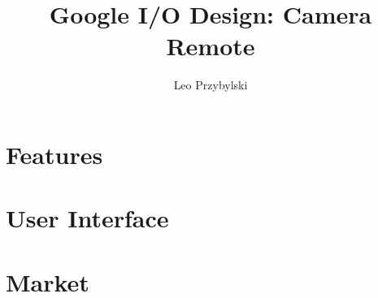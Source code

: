 \documentclass[12pt,notitlepage]{article}
\author{Leo Przybylski}
\title{Google I/O Design: Camera Remote}
\begin{document}
\maketitle
\tableofcontents

\abstract{}

\section{Features}
\section{User Interface}
\section{Market}
\end{document}
